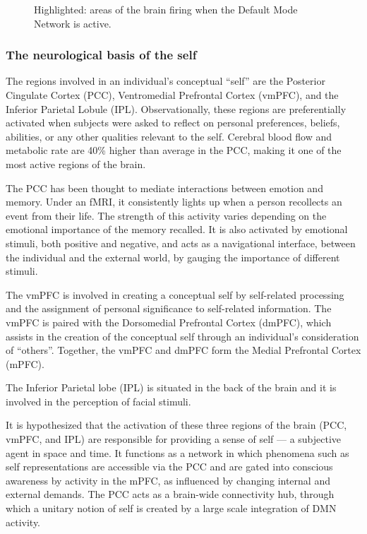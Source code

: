 \documentclass[a4paper, amsfonts, amssymb, amsmath, reprint, showkeys, nofootinbib, twoside]{revtex4-1}
\begin{document}
\begin{figure}[h!]
\begin{subfigure}[b]{0.48\linewidth}
  \end{subfigure}
  \caption{Highlighted: areas of the brain firing when the Default Mode Network is active.}
  \label{fig:dmn}
\end{figure}

\subsubsection{The neurological basis of the self}

The regions involved in an individual's conceptual ``self'' are the Posterior
Cingulate Cortex (PCC), Ventromedial Prefrontal Cortex (vmPFC), and the Inferior
Parietal Lobule (IPL). Observationally, these regions are preferentially activated when
subjects were asked to reflect on personal preferences, beliefs, abilities, or
any other qualities relevant to the self. \cite{defaultnetworkadaptive} Cerebral
blood flow and metabolic rate are 40\% higher than average in the PCC,
making it one of the most active regions of the brain. \cite{pccrole}

The PCC has been thought to mediate interactions between emotion and memory.
Under an fMRI, it consistently lights up when a person recollects an event from their
life. The strength of this activity varies depending on the emotional importance of
the memory recalled. It is also activated by emotional stimuli,
both positive and negative, and acts as a navigational interface, between the individual
and the external world, by gauging the importance of different stimuli. \cite{pccemotion}

The vmPFC is involved in creating a conceptual self by self-related processing
and the assignment of personal significance to self-related
information. \cite{dmnself} The vmPFC is paired with the Dorsomedial Prefrontal
Cortex (dmPFC), which assists in the creation of the conceptual self through an
individual's consideration of ``others''. Together, the vmPFC and dmPFC form the
Medial Prefrontal Cortex (mPFC).

The Inferior Parietal lobe (IPL) is situated in the back of the brain and it is
involved in the perception of facial stimuli. \cite{ipl}


It is hypothesized that the activation of these three regions of the brain (PCC,
vmPFC, and IPL) are responsible for providing a sense of self --- a subjective agent
in space and time. It functions as a network in which phenomena such as self
representations are accessible via the PCC \cite{mappingself} and are gated into
conscious awareness by activity in the mPFC, as influenced by changing internal
and external demands. The PCC acts as a brain-wide connectivity hub, through which a unitary notion of self is
created by a large scale integration of DMN activity. \cite{mappingself}
\end{document}
